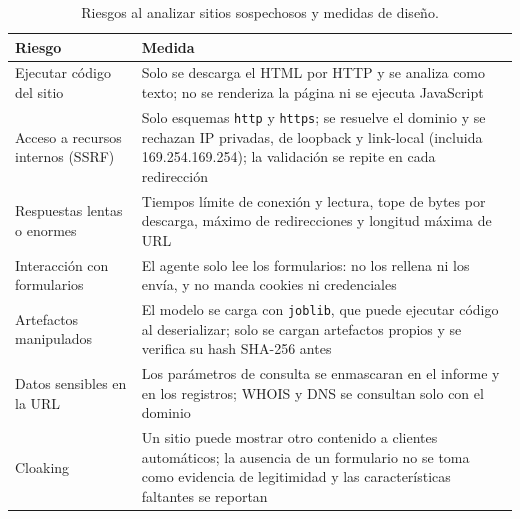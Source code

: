 \begin{table}[ht]
\caption{Riesgos al analizar sitios sospechosos y medidas de diseño.}
\label{tab:seguridad}
\centering
\footnotesize
\renewcommand{\arraystretch}{1.15}
\begin{tabular}{p{2.4cm} p{5.5cm}}
\hline
\textbf{Riesgo} & \textbf{Medida}\\
\hline
Ejecutar código del sitio & Solo se descarga el HTML por HTTP y se analiza como texto; no se renderiza la página ni se ejecuta JavaScript\\
Acceso a recursos internos (SSRF) & Solo esquemas \texttt{http} y \texttt{https}; se resuelve el dominio y se rechazan IP privadas, de loopback y link-local (incluida 169.254.169.254); la validación se repite en cada redirección\\
Respuestas lentas o enormes & Tiempos límite de conexión y lectura, tope de bytes por descarga, máximo de redirecciones y longitud máxima de URL\\
Interacción con formularios & El agente solo lee los formularios: no los rellena ni los envía, y no manda cookies ni credenciales\\
Artefactos manipulados & El modelo se carga con \texttt{joblib}, que puede ejecutar código al deserializar; solo se cargan artefactos propios y se verifica su hash SHA-256 antes\\
Datos sensibles en la URL & Los parámetros de consulta se enmascaran en el informe y en los registros; WHOIS y DNS se consultan solo con el dominio\\
Cloaking & Un sitio puede mostrar otro contenido a clientes automáticos; la ausencia de un formulario no se toma como evidencia de legitimidad y las características faltantes se reportan\\
\hline
\end{tabular}
\end{table}